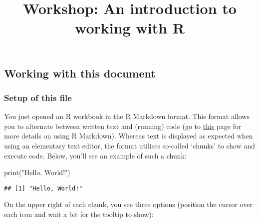 \documentclass[
]{article}
\title{Workshop: An introduction to working with R}
\author{}
\date{\vspace{-2.5em}}
\newenvironment{Shaded}{\begin{snugshade}}{\end{snugshade}}
\newcommand{\FunctionTok}[1]{\textcolor[rgb]{0.00,0.00,0.00}{#1}}
\newcommand{\NormalTok}[1]{#1}
\newcommand{\StringTok}[1]{\textcolor[rgb]{0.31,0.60,0.02}{#1}}
\begin{document}
\maketitle

\hypertarget{working-with-this-document}{%
\subsection{Working with this
document}\label{working-with-this-document}}

\hypertarget{setup-of-this-file}{%
\subsubsection{Setup of this file}\label{setup-of-this-file}}

You just opened an R workbook in the R Markdown format. This format
allows you to alternate between written text and (running) code (go to
\href{http://rmarkdown.rstudio.com}{this} page for more details on using
R Markdown). Whereas text is displayed as expected when using an
elementary text editor, the format utilises so-called `chunks' to show
and execute code. Below, you'll see an example of such a chunk:

\begin{Shaded}
\begin{Highlighting}[]
\FunctionTok{print}\NormalTok{(}\StringTok{"Hello, World!"}\NormalTok{)}
\end{Highlighting}
\end{Shaded}

\begin{verbatim}
## [1] "Hello, World!"
\end{verbatim}

On the upper right of each chunk, you see three options (position the
cursor over each icon and wait a bit for the tooltip to show):
\end{document}
